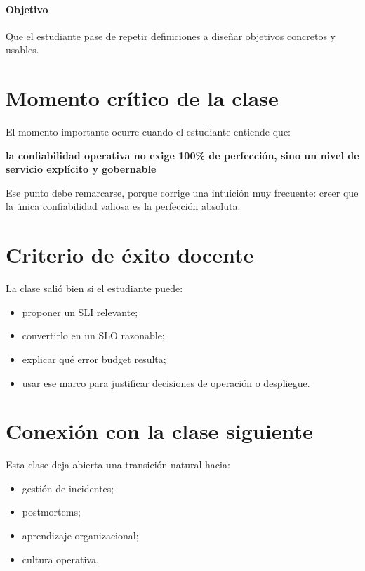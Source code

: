 \documentclass[variant=docente,cover=institutional,mode=screen]{ua-engineering-v6-article}
\begin{document}
\paragraph{Objetivo}
Que el estudiante pase de repetir definiciones a diseñar objetivos concretos y usables.

\section{Momento crítico de la clase}

El momento importante ocurre cuando el estudiante entiende que:

\begin{center}
\textbf{la confiabilidad operativa no exige 100\% de perfección, sino un nivel de servicio explícito y gobernable}
\end{center}

Ese punto debe remarcarse, porque corrige una intuición muy frecuente: creer que la única confiabilidad valiosa es la perfección absoluta.

\section{Criterio de éxito docente}

La clase salió bien si el estudiante puede:

\begin{itemize}
\item proponer un SLI relevante;
\item convertirlo en un SLO razonable;
\item explicar qué error budget resulta;
\item usar ese marco para justificar decisiones de operación o despliegue.
\end{itemize}

\section{Conexión con la clase siguiente}

Esta clase deja abierta una transición natural hacia:
\begin{itemize}
\item gestión de incidentes;
\item postmortems;
\item aprendizaje organizacional;
\item cultura operativa.
\end{itemize}
\end{document}
